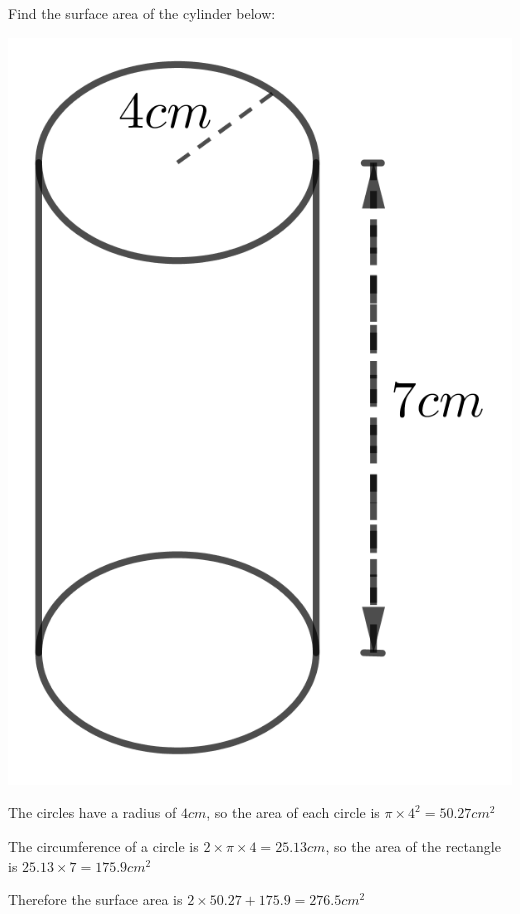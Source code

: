 \begin{exmp}
Find the surface area of the cylinder below:

\bigskip

\includegraphics{./Images/Measurement/CylinderEg.png}

\bigskip

The circles have a radius of $4cm$, so the area of each circle is $\pi \times 4^2 = 50.27cm^2$

The circumference of a circle is $2 \times \pi \times 4 = 25.13cm$, so the area of the rectangle is $25.13 \times 7 = 175.9cm^2$

Therefore the surface area is $2 \times 50.27 + 175.9 = 276.5cm^2$

\end{exmp}


